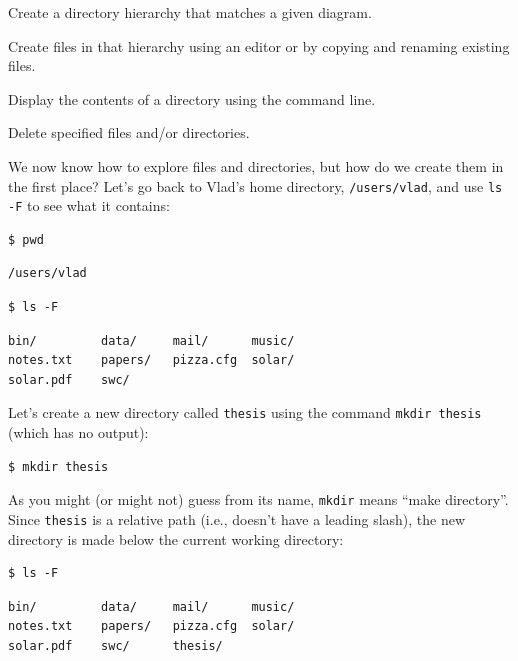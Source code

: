 \documentclass{book}
\begin{document}
\begin{objectives}
\begin{swcitemize}
\item
  Create a directory hierarchy that matches a given diagram.
\item
  Create files in that hierarchy using an editor or by copying and
  renaming existing files.
\item
  Display the contents of a directory using the command line.
\item
  Delete specified files and/or directories.
\end{swcitemize}
\end{objectives}

We now know how to explore files and directories, but how do we create
them in the first place? Let's go back to Vlad's home directory,
\texttt{/users/vlad}, and use \texttt{ls -F} to see what it contains:

\begin{verbatim}
$ pwd
\end{verbatim}

\begin{verbatim}
/users/vlad
\end{verbatim}

\begin{verbatim}
$ ls -F
\end{verbatim}

\begin{verbatim}
bin/         data/     mail/      music/
notes.txt    papers/   pizza.cfg  solar/
solar.pdf    swc/
\end{verbatim}

Let's create a new directory called \texttt{thesis} using the command
\texttt{mkdir thesis} (which has no output):

\begin{verbatim}
$ mkdir thesis
\end{verbatim}

As you might (or might not) guess from its name, \texttt{mkdir} means
``make directory''. Since \texttt{thesis} is a relative path (i.e.,
doesn't have a leading slash), the new directory is made below the
current working directory:

\begin{verbatim}
$ ls -F
\end{verbatim}

\begin{verbatim}
bin/         data/     mail/      music/
notes.txt    papers/   pizza.cfg  solar/
solar.pdf    swc/      thesis/
\end{verbatim}
\end{document}
